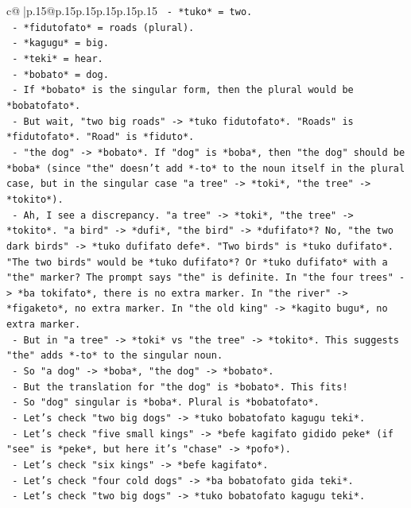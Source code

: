 \documentclass{article}
\begin{document}
{\begin{supertabular}{c@{$\;$}|p{.15\linewidth}@{}p{.15\linewidth}p{.15\linewidth}p{.15\linewidth}p{.15\linewidth}p{.15\linewidth}}
{{{\texttt{      {-} *tuko* = two.} \\
\texttt{      {-} *fidutofato* = roads (plural).} \\
\texttt{      {-} *kagugu* = big.} \\
\texttt{      {-} *teki* = hear.} \\
\texttt{      {-} *bobato* = dog.} \\
\texttt{      {-} If *bobato* is the singular form, then the plural would be *bobatofato*.} \\
\texttt{      {-} But wait, "two big roads" {-}> *tuko fidutofato*. "Roads" is *fidutofato*. "Road" is *fiduto*.} \\
\texttt{      {-} "the dog" {-}> *bobato*. If "dog" is *boba*, then "the dog" should be *boba* (since "the" doesn't add *{-}to* to the noun itself in the plural case, but in the singular case "a tree" {-}> *toki*, "the tree" {-}> *tokito*).} \\
\texttt{      {-} Ah, I see a discrepancy. "a tree" {-}> *toki*, "the tree" {-}> *tokito*. "a bird" {-}> *dufi*, "the bird" {-}> *dufifato*? No, "the two dark birds" {-}> *tuko dufifato defe*. "Two birds" is *tuko dufifato*. "The two birds" would be *tuko dufifato*? Or *tuko dufifato* with a "the" marker? The prompt says "the" is definite. In "the four trees" {-}> *ba tokifato*, there is no extra marker. In "the river" {-}> *figaketo*, no extra marker. In "the old king" {-}> *kagito bugu*, no extra marker.} \\
\texttt{      {-} But in "a tree" {-}> *toki* vs "the tree" {-}> *tokito*. This suggests "the" adds *{-}to* to the singular noun.} \\
\texttt{      {-} So "a dog" {-}> *boba*, "the dog" {-}> *bobato*.} \\
\texttt{      {-} But the translation for "the dog" is *bobato*. This fits!} \\
\texttt{      {-} So "dog" singular is *boba*. Plural is *bobatofato*.} \\
\texttt{      {-} Let's check "two big dogs" {-}> *tuko bobatofato kagugu teki*.} \\
\texttt{      {-} Let's check "five small kings" {-}> *befe kagifato gidido peke* (if "see" is *peke*, but here it's "chase" {-}> *pofo*).} \\
\texttt{      {-} Let's check "six kings" {-}> *befe kagifato*.} \\
\texttt{      {-} Let's check "four cold dogs" {-}> *ba bobatofato gida teki*.} \\
\texttt{      {-} Let's check "two big dogs" {-}> *tuko bobatofato kagugu teki*.} \\
}}}
\end{supertabular}}
\end{document}
